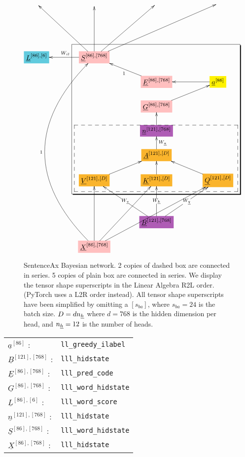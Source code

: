\documentclass[12pt]{article}
\begin{document}
\begin{figure}[h!]\centering
$$\xymatrix@R=1.5pc@C=3.5pc{
&&&&
\\
&&&&
\\
&&&&
\\
*+[F*:SkyBlue]{\underline{L}^{[86], [6]}}&*+[F*:pink]{\underline{S}^{[86], [768]}}\ar[uuu]\ar[uuul]\ar[uuur]\ar[uuurr]\ar[l]_{W_{il}}&&&
\\
&&*+[F*:pink]{\underline{E}^{[86], [768]}}\ar[ul]^{1}&*+[F*:yellow]{\underline{a}^{[86]}}\ar[l]&
\\
&&*+[F*:pink]{\underline{G}^{[86], [768]}}\ar[ur]&&
\\
&&*+[F*:Orchid]{\underline{n}^{[121], [768]}}\ar[u]&&
\\
&&*+[F*:Dandelion]{\underline{A}^{[121], [D]}}\ar[u]_{W_\rva}&&
\\
&*+[F*:Dandelion]{\underline{V}^{[121], [D]}}\ar[ur]&*+[F*:Dandelion]{\underline{K}^{[121], [D]}}\ar[u]&*+[F*:Dandelion]{\underline{Q}^{[121], [D]}}\ar[ul]&
\\
&&&&
\\
&&*+[F*:Orchid]{\underline{B}^{[121], [768]}}\ar[uu]|-{W_\rvk}\ar[uur]|-{W_\rvq}\ar[uul]|-{W_\rvv}&&
\\
&*+[F*:pink]{\underline{X}^{[86], [768]}}\ar[uuur]\ar[uuurr]\ar@/^6pc/[uuuuuuuu]^{1}\ar[uuu]&&&
\save
\POS"4,2"."9,2"."4,4"."9,4"!C*+<2em>\frm{-,}
\POS"7,2"."9,2"."7,4"."9,4"!C*+<1.3em>\frm{--}
\restore
}$$
\caption{SentenceAx Bayesian network. 2 copies of dashed box are connected in series. 5 copies of plain box are connected in series. We display the tensor shape superscripts in the Linear Algebra R2L order. (PyTorch uses a L2R order instead). All tensor shape superscripts have been simplified by omitting a $[s_{ba}]$, where $s_{ba}=24$ is the batch size. $D= d n_{\underline{h}}$ where $d=768$ is the hidden dimension per head, and $n_{\underline{h}}=12$ is the number of heads. }
\label{fig-texnn-for-sentence-ax-bnet}
\end{figure}

\begin{tabular}{ll}
$\underline{a}^{[86]}$ :&{\tt ll\_greedy\_ilabel}\\
$\underline{B}^{[121], [768]}$ :&{\tt lll\_hidstate}\\
$\underline{E}^{[86], [768]}$ :&{\tt lll\_pred\_code}\\
$\underline{G}^{[86], [768]}$ :&{\tt lll\_word\_hidstate}\\
$\underline{L}^{[86], [6]}$ :&{\tt lll\_word\_score}\\
$\underline{n}^{[121], [768]}$ :&{\tt lll\_hidstate}\\
$\underline{S}^{[86], [768]}$ :&{\tt lll\_word\_hidstate}\\
$\underline{X}^{[86], [768]}$ :&{\tt lll\_hidstate}
\end{tabular}
\end{document}
